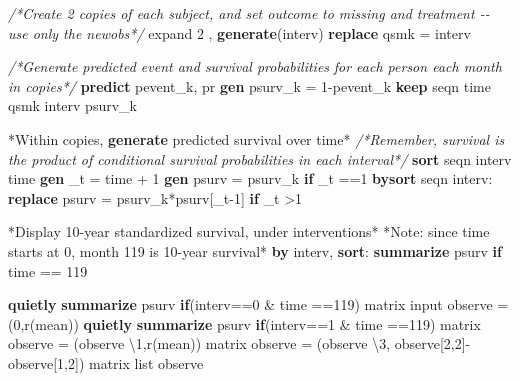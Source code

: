 \documentclass[
  10pt,
]{book}
\newenvironment{Shaded}{\begin{snugshade}}{\end{snugshade}}
\newcommand{\BaseNTok}[1]{\textcolor[rgb]{0.00,0.00,0.81}{#1}}
\newcommand{\CommentTok}[1]{\textcolor[rgb]{0.56,0.35,0.01}{\textit{#1}}}
\newcommand{\FunctionTok}[1]{\textcolor[rgb]{0.00,0.00,0.00}{#1}}
\newcommand{\KeywordTok}[1]{\textcolor[rgb]{0.13,0.29,0.53}{\textbf{#1}}}
\newcommand{\NormalTok}[1]{#1}
\newcommand{\OtherTok}[1]{\textcolor[rgb]{0.56,0.35,0.01}{#1}}
\begin{document}
\begin{Shaded}
\begin{Highlighting}[]
\CommentTok{/*Create 2 copies of each subject, and set outcome }
\CommentTok{to missing and treatment {-}{-} use only the newobs*/}
\NormalTok{expand 2 , }\KeywordTok{generate}\NormalTok{(interv) }
\KeywordTok{replace}\NormalTok{ qsmk = interv   }

\CommentTok{/*Generate predicted event and survival probabilities }
\CommentTok{for each person each month in copies*/}
\KeywordTok{predict}\NormalTok{ pevent\_k, pr}
\KeywordTok{gen}\NormalTok{ psurv\_k = 1{-}pevent\_k}
\KeywordTok{keep}\NormalTok{ seqn time qsmk interv psurv\_k }

\NormalTok{*Within copies, }\KeywordTok{generate}\NormalTok{ predicted survival }\BaseNTok{over}\NormalTok{ time*}
\CommentTok{/*Remember, survival is the product of conditional survival}
\CommentTok{probabilities in each interval*/}
\KeywordTok{sort}\NormalTok{ seqn interv time}
\KeywordTok{gen}\NormalTok{ \_t = time + 1}
\KeywordTok{gen}\NormalTok{ psurv = psurv\_k }\KeywordTok{if}\NormalTok{ \_t ==1       }
\KeywordTok{bysort}\NormalTok{ seqn interv: }\KeywordTok{replace}\NormalTok{ psurv = psurv\_k*psurv[\_t{-}1] }\KeywordTok{if}\NormalTok{ \_t \textgreater{}1 }

\NormalTok{*Display 10{-}}\FunctionTok{year}\NormalTok{ standardized survival, under interventions*}
\NormalTok{*Note: since time starts }\FunctionTok{at}\NormalTok{ 0, }\FunctionTok{month}\NormalTok{ 119 is 10{-}}\FunctionTok{year}\NormalTok{ survival*}
\KeywordTok{by}\NormalTok{ interv, }\KeywordTok{sort}\NormalTok{: }\KeywordTok{summarize}\NormalTok{ psurv }\KeywordTok{if}\NormalTok{ time == 119}

\KeywordTok{quietly} \KeywordTok{summarize}\NormalTok{ psurv }\KeywordTok{if}\NormalTok{(interv==0 \& time ==119)}
\FunctionTok{matrix}\NormalTok{ input observe = (0,}\OtherTok{\textasciigrave{}r(mean)\textquotesingle{}}\NormalTok{)}
\KeywordTok{quietly} \KeywordTok{summarize}\NormalTok{ psurv }\KeywordTok{if}\NormalTok{(interv==1 \& time ==119)}
\FunctionTok{matrix}\NormalTok{ observe = (observe \textbackslash{}1,}\OtherTok{\textasciigrave{}r(mean)\textquotesingle{}}\NormalTok{)}
\FunctionTok{matrix}\NormalTok{ observe = (observe \textbackslash{}3, observe[2,2]{-}observe[1,2]) }
\FunctionTok{matrix} \OtherTok{list}\NormalTok{ observe}


\end{Highlighting}
\end{Shaded}
\end{document}
